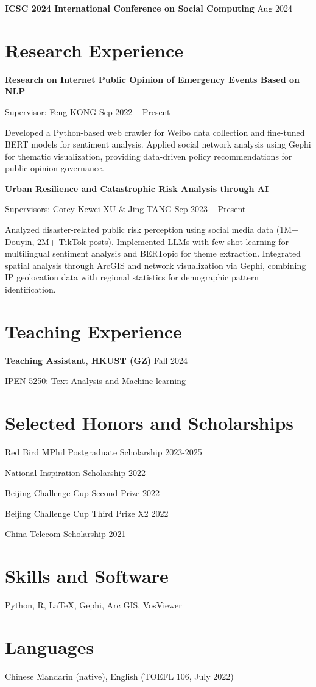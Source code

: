 \documentclass[letterpaper, 11pt]{article}
\newcommand{\sepspace}{\vspace{0.5em}}
\begin{document}
\sepspace
\textbf{ICSC 2024 International Conference on Social Computing} \hfill Aug 2024

\section{Research Experience}
\textbf{Research on Internet Public Opinion of Emergency Events Based on NLP}

Supervisor: \href{https://cohd.cau.edu.cn/art/2020/11/27/art_48059_998984.html}{Feng KONG} \hfill Sep 2022 -- Present

Developed a Python-based web crawler for Weibo data collection and fine-tuned BERT models for sentiment analysis. Applied social network analysis using Gephi for thematic visualization, providing data-driven policy recommendations for public opinion governance.

\sepspace
\textbf{Urban Resilience and Catastrophic Risk Analysis through AI}

Supervisors: \href{https://facultyprofiles.hkust-gz.edu.cn/faculty-personal-page/XU-Kewei/coreyxu}{Corey Kewei XU} \& \href{https://facultyprofiles.hkust-gz.edu.cn/faculty-personal-page/TANG-Jing/jingtang}{Jing TANG} \hfill Sep 2023 -- Present

Analyzed disaster-related public risk perception using social media data (1M+ Douyin, 2M+ TikTok posts). Implemented LLMs with few-shot learning for multilingual sentiment analysis and BERTopic for theme extraction. Integrated spatial analysis through ArcGIS and network visualization via Gephi, combining IP geolocation data with regional statistics for demographic pattern identification.

\section{Teaching Experience}
\textbf{Teaching Assistant, HKUST (GZ)} \hfill Fall 2024

IPEN 5250: Text Analysis and Machine learning

\section{Selected Honors and Scholarships}
Red Bird MPhil Postgraduate Scholarship \hfill 2023-2025

National Inspiration Scholarship \hfill 2022

Beijing Challenge Cup Second Prize \hfill 2022

Beijing Challenge Cup Third Prize X2 \hfill 2022

China Telecom Scholarship \hfill 2021

\section{Skills and Software}
Python, R, \LaTeX, Gephi, Arc GIS, VosViewer

\section{Languages}
Chinese Mandarin (native), English (TOEFL 106, July 2022)
\end{document}
